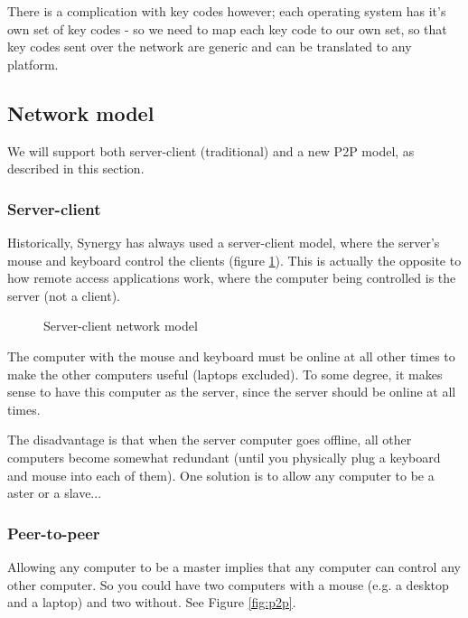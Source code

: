 There is a complication with key codes however; each operating system has it's
own set of key codes - so we need to map each key code to our own set, so that
key codes sent over the network are generic and can be translated to any 
platform.

\subsection{Network model}

We will support both server-client (traditional) and a new P2P model, as
described in this section.

\subsubsection{Server-client}

Historically, Synergy has always used a server-client model, where the server's
mouse and keyboard control the clients (figure \ref{fig:serverClient}). This is
actually the opposite to how remote access applications work, where the computer
being controlled is the server (not a client).

\begin{figure}[ht!]
  \centering
  
  \caption{Server-client network model}
  \label{fig:serverClient}
\end{figure}

The computer with the mouse and keyboard must be online at all other times to
make the other computers useful (laptops excluded). To some degree, it makes 
sense to have this computer as the server, since the server should be online
at all times.

The disadvantage is that when the server computer goes offline, all other 
computers become somewhat redundant (until you physically plug a keyboard
and mouse into each of them). One solution is to allow any computer to be a 
aster or a slave...

\subsubsection{Peer-to-peer}


Allowing any computer to be a master implies that any computer can control
any other computer. So you could have two computers with a mouse (e.g. a 
desktop and a laptop) and two without. See Figure \ref{fig:p2p}.

